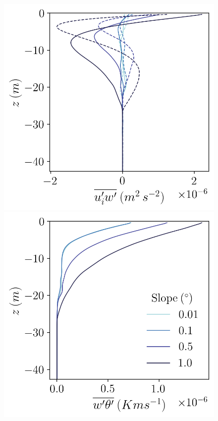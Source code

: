 \documentclass[draft]{styles/agujournal2019}
\begin{document}
\begin{figure}[h!]
\begin{minipage}{0.33\textwidth}
    \end{minipage}
    \begin{minipage}{0.33\textwidth}
        \includegraphics[trim={0 0 0 0},clip,width=\textwidth]{Figures/momflux_cmp_dslope_43h_tav13h_z_profile.png}
    \end{minipage}%
    \begin{minipage}{0.33\textwidth}
        \includegraphics[trim={0 0 0 0},clip,width=\textwidth]{Figures/heatflux_cmp_dslope_43h_tav13h_z_profile.png}

\end{minipage}
\end{figure}
\end{document}
